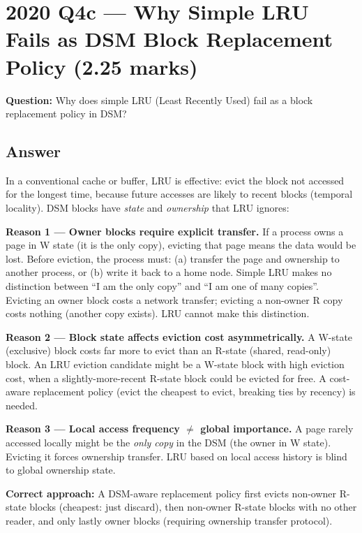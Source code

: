 \documentclass[12pt,a4paper]{article}
\begin{document}
\section{2020 Q4c --- Why Simple LRU Fails as DSM Block Replacement Policy (2.25 marks)}

\textbf{Question:} Why does simple LRU (Least Recently Used) fail as a block replacement policy in DSM?

\subsection*{Answer}

In a conventional cache or buffer, LRU is effective: evict the block not accessed for the longest time, because future accesses are likely to recent blocks (temporal locality). DSM blocks have \emph{state} and \emph{ownership} that LRU ignores:

\textbf{Reason 1 --- Owner blocks require explicit transfer.}
If a process owns a page in W state (it is the only copy), evicting that page means the data would be lost. Before eviction, the process must: (a) transfer the page and ownership to another process, or (b) write it back to a home node. Simple LRU makes no distinction between ``I am the only copy'' and ``I am one of many copies''. Evicting an owner block costs a network transfer; evicting a non-owner R copy costs nothing (another copy exists). LRU cannot make this distinction.

\textbf{Reason 2 --- Block state affects eviction cost asymmetrically.}
A W-state (exclusive) block costs far more to evict than an R-state (shared, read-only) block. An LRU eviction candidate might be a W-state block with high eviction cost, when a slightly-more-recent R-state block could be evicted for free. A cost-aware replacement policy (evict the cheapest to evict, breaking ties by recency) is needed.

\textbf{Reason 3 --- Local access frequency $\neq$ global importance.}
A page rarely accessed locally might be the \emph{only copy} in the DSM (the owner in W state). Evicting it forces ownership transfer. LRU based on local access history is blind to global ownership state.

\textbf{Correct approach:} A DSM-aware replacement policy first evicts non-owner R-state blocks (cheapest: just discard), then non-owner R-state blocks with no other reader, and only lastly owner blocks (requiring ownership transfer protocol).
\end{document}
